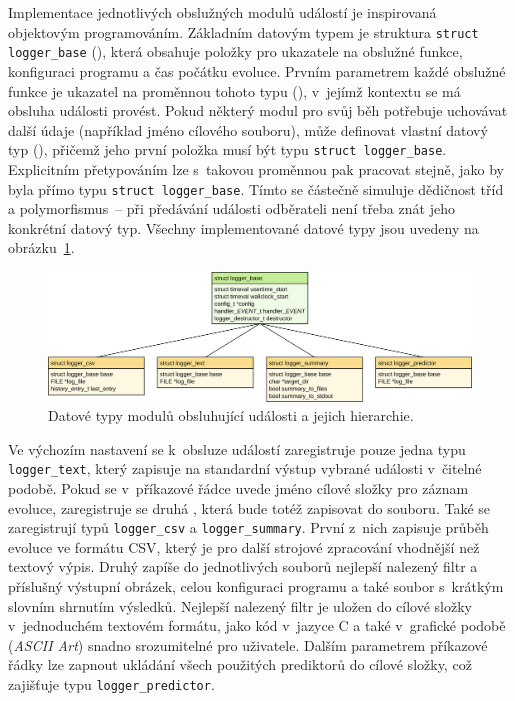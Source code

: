 Implementace jednotlivých obslužných modulů událostí je inspirovaná objektovým programováním. Základním datovým typem je struktura \texttt{struct logger\_base} (), která obsahuje položky pro ukazatele na obslužné funkce, konfiguraci programu a čas počátku evoluce. Prvním parametrem každé obslužné funkce je ukazatel na proměnnou tohoto typu (), v~jejímž kontextu se má obsluha události provést. Pokud některý modul pro svůj běh potřebuje uchovávat další údaje (například jméno cílového souboru), může definovat vlastní datový typ (), přičemž jeho první položka musí být typu \texttt{struct logger\_base}. Explicitním přetypováním lze s~takovou proměnnou pak pracovat stejně, jako by byla přímo typu \texttt{struct logger\_base}. Tímto se částečně simuluje dědičnost tříd a polymorfismus~-- při předávání události odběrateli není třeba znát jeho konkrétní datový typ. Všechny implementované datové typy jsou uvedeny na obrázku~\ref{obrLoggersTypes}.

\begin{figure}[htb]
    \centering
    \includegraphics[width=\textwidth]{fig/loggertypes}
    \caption{Datové typy modulů obsluhující události a jejich hierarchie.}
    \label{obrLoggersTypes}
\end{figure}

Ve výchozím nastavení se k~obsluze událostí zaregistruje pouze jedna  typu \texttt{logger\_text}, který zapisuje na standardní výstup vybrané události v~čitelné podobě. Pokud se v~příkazové řádce uvede jméno cílové složky pro záznam evoluce, zaregistruje se druhá , která bude totéž zapisovat do souboru. Také se zaregistrují  typů \texttt{logger\_csv} a \texttt{logger\_summary}. První z~nich zapisuje průběh evoluce ve formátu CSV, který je pro další strojové zpracování vhodnější než textový výpis. Druhý zapíše do jednotlivých souborů nejlepší nalezený filtr a příslušný výstupní obrázek, celou konfiguraci programu a také soubor s~krátkým slovním shrnutím výsledků. Nejlepší nalezený filtr je uložen do cílové složky v~jednoduchém textovém formátu, jako kód v~jazyce C a také v~grafické podobě (\emph{ASCII Art}) snadno srozumitelné pro uživatele. Dalším parametrem příkazové řádky lze zapnout ukládání všech použitých prediktorů do cílové složky, což zajišťuje  typu \texttt{logger\_predictor}.

